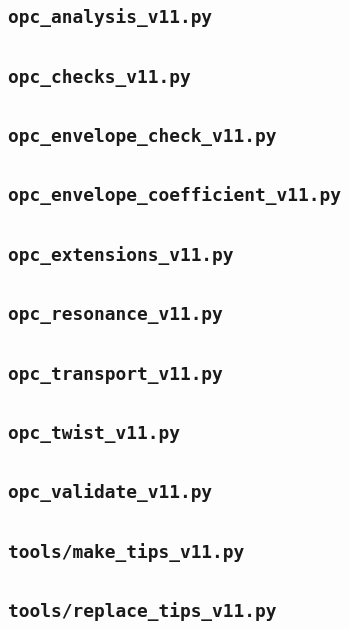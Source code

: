 \documentclass[preprint,12pt]{elsarticle}
\numberwithin{equation}{section}
\theoremstyle{plain}
\theoremstyle{definition}
\theoremstyle{remark}
\begin{document}
\subsection{\texttt{opc\_analysis\_v11.py}}


\subsection{\texttt{opc\_checks\_v11.py}}


\subsection{\texttt{opc\_envelope\_check\_v11.py}}


\subsection{\texttt{opc\_envelope\_coefficient\_v11.py}}


\subsection{\texttt{opc\_extensions\_v11.py}}


\subsection{\texttt{opc\_resonance\_v11.py}}


\subsection{\texttt{opc\_transport\_v11.py}}


\subsection{\texttt{opc\_twist\_v11.py}}


\subsection{\texttt{opc\_validate\_v11.py}}


\subsection{\texttt{tools/make\_tips\_v11.py}}


\subsection{\texttt{tools/replace\_tips\_v11.py}}

\end{document}
